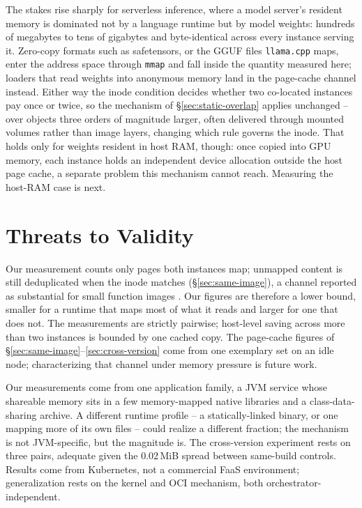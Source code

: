 \documentclass[sigplan,10pt,natbib=false]{acmart}
\begin{document}
The stakes rise sharply for serverless inference, where a model
server's resident memory is dominated not by a language runtime but by
model weights: hundreds of megabytes to tens of gigabytes and
byte-identical across every instance serving it. Zero-copy
formats such as safetensors, or the GGUF files \texttt{llama.cpp}
maps, enter the address space through \texttt{mmap} and fall inside
the quantity measured here; loaders that read weights into anonymous
memory land in the page-cache channel instead. Either way the inode
condition decides whether two co-located instances pay once or twice,
so the mechanism of \S\ref{sec:static-overlap} applies unchanged --
over objects three orders of magnitude larger, often delivered through
mounted volumes rather than image layers, changing which rule governs
the inode. That holds only for weights resident in host RAM, though:
once copied into GPU memory, each instance holds an independent device
allocation outside the host page cache, a separate problem this
mechanism cannot reach. Measuring the host-RAM case is next.

\section{Threats to Validity}
\label{sec:threats}

Our measurement counts only pages both instances map; unmapped content
is still deduplicated when the inode matches
(\S\ref{sec:same-image}), a channel reported as substantial for
small function images \cite{cheng2024slo}. Our figures are therefore a
lower bound, smaller for a runtime that maps most of what it reads and
larger for one that does not. The measurements are strictly pairwise; host-level
saving across more than two instances is bounded by one cached copy.
The page-cache figures of \S\ref{sec:same-image}--\ref{sec:cross-version}
come from one exemplary set on an idle node; characterizing that
channel under memory pressure is future work.

Our measurements come from one application family, a JVM service whose
shareable memory sits in a few memory-mapped native libraries and a
class-data-sharing archive. A different runtime profile -- a
statically-linked binary, or one mapping more of its own files -- could
realize a different fraction; the mechanism is not JVM-specific, but
the magnitude is. The cross-version experiment rests on three pairs,
adequate given the 0.02\,MiB spread between same-build controls. Results
come from Kubernetes, not a commercial FaaS environment; generalization
rests on the kernel and OCI mechanism, both orchestrator-independent.
\end{document}
